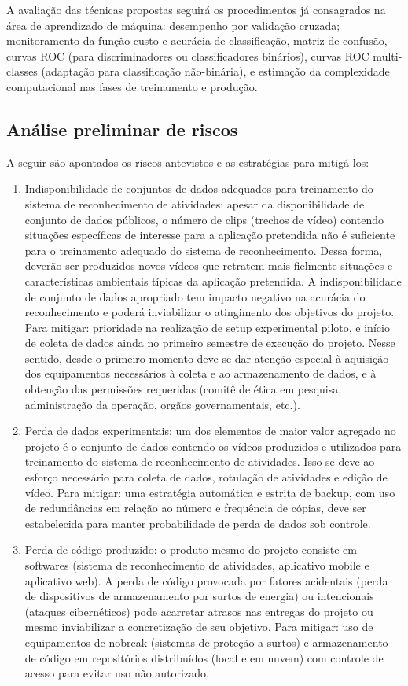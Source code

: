 A avaliação das técnicas propostas seguirá os procedimentos já consagrados na área de aprendizado de máquina: desempenho por validação cruzada; monitoramento da função custo e acurácia de classificação, matriz de confusão, curvas ROC (para discriminadores ou classificadores binários), curvas ROC multi-classes (adaptação para classificação não-binária), e estimação da complexidade computacional nas fases de treinamento e produção. 


\subsection{Análise preliminar de riscos}
\label{ssec:risco}
A seguir são apontados os riscos antevistos e as estratégias para mitigá-los: 
\begin{enumerate}
	\item Indisponibilidade de conjuntos de dados adequados para treinamento do sistema de reconhecimento de atividades: apesar da disponibilidade de conjunto de dados públicos, o número de clips (trechos de vídeo) contendo situações específicas de interesse para a aplicação pretendida não é suficiente para o treinamento adequado do sistema de reconhecimento. Dessa forma, deverão ser produzidos novos vídeos que retratem mais fielmente situações e características ambientais típicas da aplicação pretendida. A indisponibilidade de conjunto de dados apropriado tem impacto negativo na acurácia do reconhecimento e poderá inviabilizar o atingimento dos objetivos do projeto. Para mitigar: prioridade na realização de setup experimental piloto, e início de coleta de dados ainda no primeiro semestre de execução do projeto. Nesse sentido, desde o primeiro momento deve se dar atenção especial à aquisição dos equipamentos necessários à coleta e ao armazenamento de dados, e à obtenção das permissões requeridas (comitê de ética em pesquisa, administração da operação, orgãos governamentais, etc.).
	\item Perda de dados experimentais: um dos elementos de maior valor agregado no projeto é o conjunto de dados contendo os vídeos produzidos e utilizados para treinamento do sistema de reconhecimento de atividades. Isso se deve ao esforço necessário para coleta de dados, rotulação de atividades e edição de vídeo. Para mitigar: uma estratégia automática e estrita de backup, com uso de redundâncias em relação ao número e frequência de cópias, deve ser estabelecida para manter probabilidade de perda de dados sob controle.
	\item Perda de código produzido: o produto mesmo do projeto consiste em softwares (sistema de reconhecimento de atividades, aplicativo mobile e aplicativo web). A perda de código provocada por fatores acidentais (perda de dispositivos de armazenamento por surtos de energia) ou intencionais (ataques cibernéticos) pode acarretar atrasos nas entregas do projeto ou mesmo inviabilizar a concretização de seu objetivo. Para mitigar: uso de equipamentos de nobreak (sistemas de proteção a surtos) e armazenamento de código em repositórios distribuídos (local e em nuvem) com controle de acesso para evitar uso não autorizado.

\end{enumerate}
